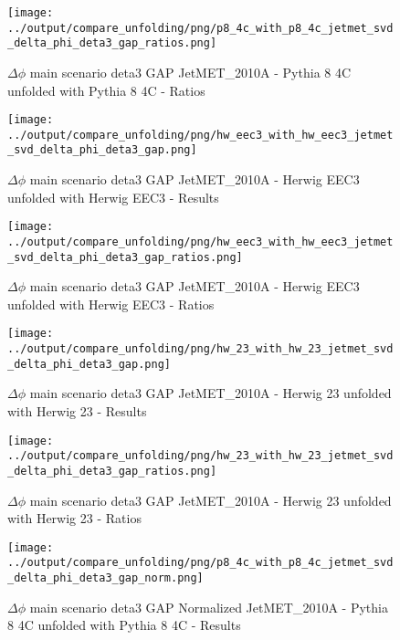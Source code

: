 \documentclass[11pt]{book}
\begin{document}
\begin{figure}[ht]
\centering
\texttt{[image: ../output/compare\_unfolding/png/p8\_4c\_with\_p8\_4c\_jetmet\_svd\_delta\_phi\_deta3\_gap\_ratios.png]}
\caption{$\Delta\phi$ main scenario deta3 GAP JetMET\_2010A - Pythia 8 4C unfolded with Pythia 8 4C - Ratios}
\label{p8_p8_jetmet_svd_delta_phi_deta3_gap_b}
\end{figure}

\begin{figure}[ht]
\centering
\texttt{[image: ../output/compare\_unfolding/png/hw\_eec3\_with\_hw\_eec3\_jetmet\_svd\_delta\_phi\_deta3\_gap.png]}
\caption{$\Delta\phi$ main scenario deta3 GAP JetMET\_2010A - Herwig EEC3 unfolded with Herwig EEC3 - Results}
\label{hw_eec3_hw_eec3_jetmet_svd_delta_phi_deta3_gap_a}
\end{figure}

\begin{figure}[ht]
\centering
\texttt{[image: ../output/compare\_unfolding/png/hw\_eec3\_with\_hw\_eec3\_jetmet\_svd\_delta\_phi\_deta3\_gap\_ratios.png]}
\caption{$\Delta\phi$ main scenario deta3 GAP JetMET\_2010A - Herwig EEC3 unfolded with Herwig EEC3 - Ratios}
\label{hw_eec3_hw_eec3_jetmet_svd_delta_phi_deta3_gap_b}
\end{figure}

\begin{figure}[ht]
\centering
\texttt{[image: ../output/compare\_unfolding/png/hw\_23\_with\_hw\_23\_jetmet\_svd\_delta\_phi\_deta3\_gap.png]}
\caption{$\Delta\phi$ main scenario deta3 GAP JetMET\_2010A - Herwig 23 unfolded with Herwig 23 - Results}
\label{hw_23_hw_23_jetmet_svd_delta_phi_deta3_gap_a}
\end{figure}

\begin{figure}[ht]
\centering
\texttt{[image: ../output/compare\_unfolding/png/hw\_23\_with\_hw\_23\_jetmet\_svd\_delta\_phi\_deta3\_gap\_ratios.png]}
\caption{$\Delta\phi$ main scenario deta3 GAP JetMET\_2010A - Herwig 23 unfolded with Herwig 23 - Ratios}
\label{hw_23_hw_23_jetmet_svd_delta_phi_deta3_gap_b}
\end{figure}


\begin{figure}[ht]
\centering
\texttt{[image: ../output/compare\_unfolding/png/p8\_4c\_with\_p8\_4c\_jetmet\_svd\_delta\_phi\_deta3\_gap\_norm.png]}
\caption{$\Delta\phi$ main scenario deta3 GAP Normalized JetMET\_2010A - Pythia 8 4C unfolded with Pythia 8 4C - Results}
\label{p8_p8_jetmet_svd_delta_phi_deta3_gap_norm_a}
\end{figure}
\end{document}
